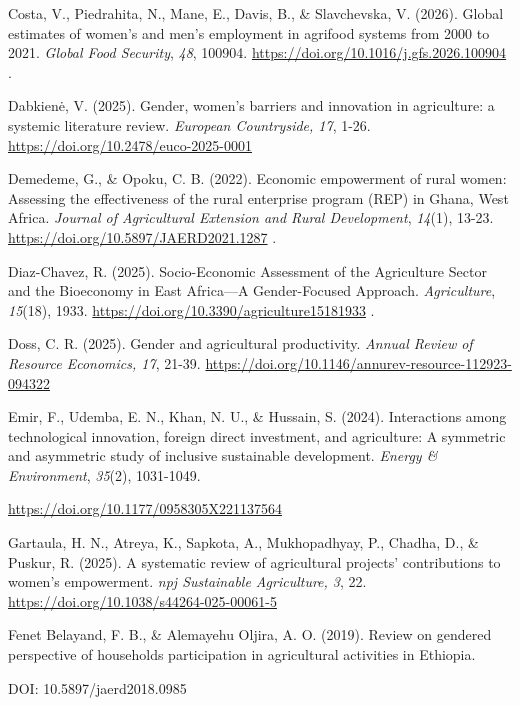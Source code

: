﻿\documentclass[sn-mathphys-num]{sn-jnl}
\newcommand{\hl}[1]{#1}
\begin{document}
\hl{Costa, V., Piedrahita, N., Mane, E., Davis, B., \& Slavchevska, V.
(2026). Global estimates of women's and men's employment in agrifood
systems from 2000 to 2021. \emph{Global Food Security}, \emph{48},
100904.} \hl{\mbox{\url{https://doi.org/10.1016/j.gfs.2026.100904}} .}

\hl{Dabkienė, V. (2025). Gender, women's barriers and innovation in
agriculture: a systemic literature review. \emph{European Countryside,
17}, 1-26.}
\href{https://doi.org/10.2478/euco-2025-0001}{\hl{https://doi.org/10.2478/euco-2025-0001}}

\hl{Demedeme, G., \& Opoku, C. B. (2022). Economic empowerment of rural
women: Assessing the effectiveness of the rural enterprise program (REP)
in Ghana, West Africa. \emph{Journal of Agricultural Extension and Rural
Development}, \emph{14}(1), 13-23.}
\hl{\mbox{\url{https://doi.org/10.5897/JAERD2021.1287}} .}

\hl{Diaz-Chavez, R. (2025). Socio-Economic Assessment of the Agriculture
Sector and the Bioeconomy in East Africa---A Gender-Focused Approach.
\emph{Agriculture}, \emph{15}(18), 1933.}
\hl{\mbox{\url{https://doi.org/10.3390/agriculture15181933}} .}

\hl{Doss, C. R. (2025). Gender and agricultural productivity.
\emph{Annual Review of Resource Economics, 17}, 21-39.}
\href{https://doi.org/10.1146/annurev-resource-112923-094322}{\hl{https://doi.org/10.1146/annurev-resource-112923-094322}}

\hl{Emir, F., Udemba, E. N., Khan, N. U., \& Hussain, S. (2024).
Interactions among technological innovation, foreign direct investment,
and agriculture: A symmetric and asymmetric study of inclusive
sustainable development. \emph{Energy \& Environment}, \emph{35}(2),
1031-1049.}

\href{https://doi.org/10.1177/0958305X221137564}{\hl{https://doi.org/10.1177/0958305X221137564}}

\hl{Gartaula, H. N., Atreya, K., Sapkota, A., Mukhopadhyay, P., Chadha,
D., \& Puskur, R. (2025). A systematic review of agricultural projects'
contributions to women's empowerment. \emph{npj Sustainable Agriculture,
3}, 22.}
\href{https://doi.org/10.1038/s44264-025-00061-5}{\hl{https://doi.org/10.1038/s44264-025-00061-5}}

\hl{Fenet Belayand, F. B., \& Alemayehu Oljira, A. O. (2019). Review on
gendered perspective of household\textquotesingle s participation in
agricultural activities in Ethiopia.}

\hl{DOI: 10.5897/jaerd2018.0985}
\end{document}

